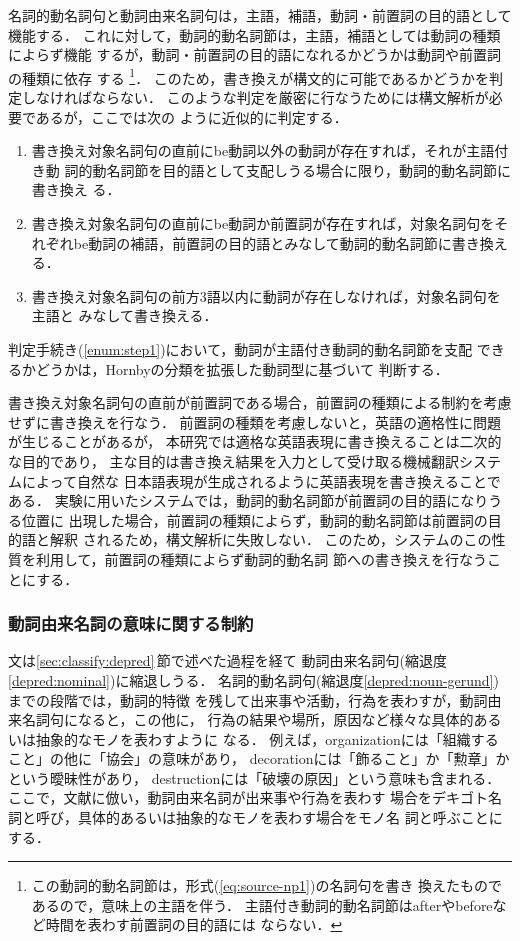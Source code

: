 名詞的動名詞句と動詞由来名詞句は，主語，補語，動詞・前置詞の目的語として
機能する．
これに対して，動詞的動名詞節は，主語，補語としては動詞の種類によらず機能
するが，動詞・前置詞の目的語になれるかどうかは動詞や前置詞の種類に依存
する
\footnote{この動詞的動名詞節は，形式(\ref{eq:source-np1})の名詞句を書き
換えたものであるので，意味上の主語\NP を伴う．
主語付き動詞的動名詞節はafterやbeforeなど時間を表わす前置詞の目的語には
ならない\cite{Quirk85}．\label{foot:prep}}． 
このため，書き換えが構文的に可能であるかどうかを判定しなければならない．
このような判定を厳密に行なうためには構文解析が必要であるが，ここでは次の
ように近似的に判定する．
\begin{enumerate}
\item\label{enum:step1}
書き換え対象名詞句の直前にbe動詞以外の動詞が存在すれば，それが主語付き動
詞的動名詞節を目的語として支配しうる場合に限り，動詞的動名詞節に書き換え
る．
\item\label{enum:step2}
書き換え対象名詞句の直前にbe動詞か前置詞が存在すれば，対象名詞句をそ
れぞれbe動詞の補語，前置詞の目的語とみなして動詞的動名詞節に書き換える．
\item\label{enum:step3}
書き換え対象名詞句の前方3語以内に動詞が存在しなければ，対象名詞句を主語と
みなして書き換える．
\end{enumerate}

判定手続き(\ref{enum:step1})において，動詞が主語付き動詞的動名詞節を支配
できるかどうかは，Hornbyの分類\cite{Hornby77}を拡張した動詞型に基づいて
判断する．

書き換え対象名詞句の直前が前置詞である場合，前置詞の種類による制約を考慮
せずに書き換えを行なう．
前置詞の種類を考慮しないと，英語の適格性に問題が生じることがあるが，
本研究では適格な英語表現に書き換えることは二次的な目的であり，
主な目的は書き換え結果を入力として受け取る機械翻訳システムによって自然な
日本語表現が生成されるように英語表現を書き換えることである．
実験に用いたシステムでは，動詞的動名詞節が前置詞の目的語になりうる位置に
出現した場合，前置詞の種類によらず，動詞的動名詞節は前置詞の目的語と解釈
されるため，構文解析に失敗しない．
このため，システムのこの性質を利用して，前置詞の種類によらず動詞的動名詞
節への書き換えを行なうことにする．

\subsubsection{動詞由来名詞の意味に関する制約}
\label{sec:rewrite:cond:sem}

文は\ref{sec:classify:depred}\,節で述べた過程を経て
動詞由来名詞句(縮退度\ref{depred:nominal})に縮退しうる．
名詞的動名詞句(縮退度\ref{depred:noun-gerund})までの段階では，動詞的特徴
を残して出来事や活動，行為を表わすが，動詞由来名詞句になると，この他に，
行為の結果や場所，原因など様々な具体的あるいは抽象的なモノを表わすように
なる\cite{Grimshaw90,Kageyama99}．
例えば，organizationには「組織すること」の他に「協会」の意味があり，
decorationには「飾ること」か「勲章」かという曖昧性があり，
destructionには「破壊の原因」という意味も含まれる．
ここで，文献\cite{Kageyama99}に倣い，動詞由来名詞が出来事や行為を表わす
場合をデキゴト名詞と呼び，具体的あるいは抽象的なモノを表わす場合をモノ名
詞と呼ぶことにする．

